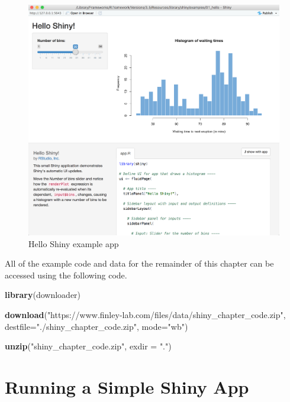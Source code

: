 \documentclass[
]{krantz}
\makeatletter
\newenvironment{Shaded}{\begin{snugshade}}{\end{snugshade}}
\newcommand{\DataTypeTok}[1]{\textcolor[rgb]{0.27,0.27,0.27}{#1}}
\newcommand{\KeywordTok}[1]{\textcolor[rgb]{0.27,0.27,0.27}{\textbf{#1}}}
\newcommand{\NormalTok}[1]{#1}
\newcommand{\StringTok}[1]{\textcolor[rgb]{0.5,0.5,0.5}{#1}}
\newenvironment{kframe}{%
\medskip{}
\setlength{\fboxsep}{.8em}
 \def\at@end@of@kframe{}%
 \ifinner\ifhmode%
  \def\at@end@of@kframe{\end{minipage}}%
  \begin{minipage}{\columnwidth}%
 \fi\fi%
 \def\FrameCommand##1{\hskip\@totalleftmargin \hskip-\fboxsep
 \colorbox{shadecolor}{##1}\hskip-\fboxsep
     \hskip-\linewidth \hskip-\@totalleftmargin \hskip\columnwidth}%
 \MakeFramed {\advance\hsize-\width
   \@totalleftmargin\z@ \linewidth\hsize
   \@setminipage}}%
 {\par\unskip\endMakeFramed%
 \at@end@of@kframe}
\renewenvironment{Shaded}{\begin{kframe}}{\end{kframe}}
\makeatother
\begin{document}
\begin{figure}
\includegraphics[width=1\linewidth]{../figures/hello_shiny} \caption{Hello Shiny example app}\label{fig:hello}
\end{figure}

All of the example code and data for the remainder of this chapter can be accessed using the following code.

\begin{Shaded}
\begin{Highlighting}[]
\KeywordTok{library}\NormalTok{(downloader)}

\KeywordTok{download}\NormalTok{(}\StringTok{"https://www.finley{-}lab.com/files/data/shiny\_chapter\_code.zip"}\NormalTok{, }
         \DataTypeTok{destfile=}\StringTok{"./shiny\_chapter\_code.zip"}\NormalTok{, }\DataTypeTok{mode=}\StringTok{"wb"}\NormalTok{)}

\KeywordTok{unzip}\NormalTok{(}\StringTok{"shiny\_chapter\_code.zip"}\NormalTok{, }\DataTypeTok{exdir =} \StringTok{"."}\NormalTok{)}
\end{Highlighting}
\end{Shaded}

\hypertarget{running-a-simple-shiny-app}{%
\section{Running a Simple Shiny App}\label{running-a-simple-shiny-app}}
\end{document}

